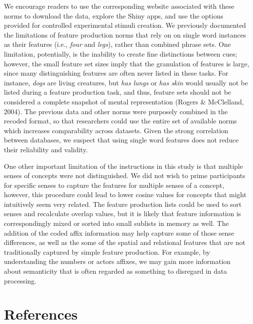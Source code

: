 \documentclass[english,,man]{apa6}
\theoremstyle{definition}
\theoremstyle{definition}
\theoremstyle{definition}
\theoremstyle{remark}
\begin{document}
We encourage readers to use the corresponding website associated with
these norms to download the data, explore the Shiny apps, and use the
options provided for controlled experimental stimuli creation. We
previously documented the limitations of feature production norms that
rely on on single word instances as their features (i.e., \emph{four}
and \emph{legs}), rather than combined phrase sets. One limitation,
potentially, is the inability to create fine distinctions between cues;
however, the small feature set sizes imply that the granulation of
features is large, since many distinguishing features are often never
listed in these tasks. For instance, \emph{dogs} are living creatures,
but \emph{has lungs} or \emph{has skin} would usually not be listed
during a feature production task, and thus, feature sets should not be
considered a complete snapshot of mental representation (Rogers \&
McClelland, 2004). The previous data and other norms were purposely
combined in the recoded format, so that researchers could use the entire
set of available norms which increases comparability across datasets.
Given the strong correlation between databases, we suspect that using
single word features does not reduce their reliability and validity.

One other important limitation of the instructions in this study is that
multiple senses of concepts were not distinguished. We did not wish to
prime participants for specific senses to capture the features for
multiple senses of a concept, however, this procedure could lead to
lower cosine values for concepts that might intuitively seem very
related. The feature production lists could be used to sort senses and
recalculate overlap values, but it is likely that feature information is
correspondingly mixed or sorted into small sublists in memory as well.
The addition of the coded affix information may help capture some of
those sense differences, as well as the some of the spatial and
relational features that are not traditionally captured by simple
feature production. For example, by understanding the numbers or actors
affixes, we may gain more information about semanticity that is often
regarded as something to disregard in data processing.

\newpage

\section{References}\label{references}

\setlength{\parindent}{-0.5in} \setlength{\leftskip}{0.5in}
\end{document}

